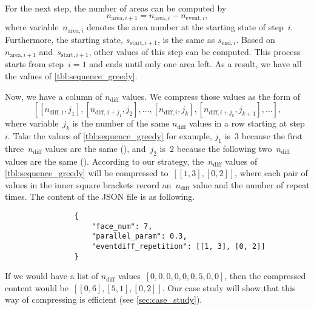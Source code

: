 \documentclass[ijgi,article,submit,moreauthors,pdftex]{Definitions/mdpi}
\begin{document}
For the next step, the number of areas can be computed by
$$
n_{\mathrm{area},i+1} = n_{\mathrm{area},i} - n_{\mathrm{event},i},
$$
where variable~$n_{\mathrm{area},i}$ denotes the area number 
at the starting state of step~$i$.
Furthermore, the starting state, $s_{\mathrm{start},i+1}$, is the same as  
$s_{\mathrm{end},i}$.
Based on~$n_{\mathrm{area},i+1}$ and~$s_{\mathrm{start},i+1}$,
other values of this step can be computed.
This process starts from step~$i=1$ and ends until only one area left.
As a result, we have all the values of \tbl\ref{tbl:sequence_greedy}.



Now, we have a column of $n_\mathrm{diff}$ values.
We compress those values as the form of 
$$
[[n_{\mathrm{diff},1},j_1], [n_{\mathrm{diff},1+j_1},j_2], \ldots, 
[n_{\mathrm{diff},i},j_k], [n_{\mathrm{diff},i+j_k},j_{k+1}], \ldots],
$$
where variable~$j_k$ is the number of the same $n_\mathrm{diff}$ values in a row 
starting at step~$i$.
Take the values of \tbl\ref{tbl:sequence_greedy} for example, 
$j_1$ is~$3$ 
because the first three~$n_\mathrm{diff}$ values are the same (),
and~$j_2$ is~$2$ 
because the following two~$n_\mathrm{diff}$ values are the same (). 
According to our strategy, 
the~$n_\mathrm{diff}$ values of \tbl\ref{tbl:sequence_greedy}
will be compressed to~$[[1,3], [0,2]]$,
where each pair of values in the inner square brackets 
record an~$n_\mathrm{diff}$ value and the number of repeat times.
The content of the JSON file is as following.
\begin{verbatim}
                {
                    "face_num": 7,
                    "parallel_param": 0.3,                    
                    "eventdiff_repetition": [[1, 3], [0, 2]]
                }
\end{verbatim}
If we would have a list of $n_\mathrm{diff}$ values~$[0, 0, 0, 0, 0, 0, 5, 0, 0]$,
then the compressed content would be~$[[0,6], [5,1], [0,2]]$.
Our case study will show that this way of compressing is efficient
(see \sect\ref{sec:case_study}).
\end{document}
